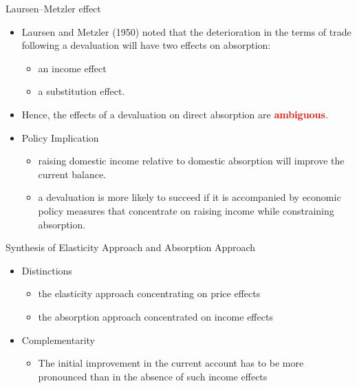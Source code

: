 \documentclass[10pt,hyperref={CJKbookmarks=true},xcolor=dvipsnames,aspectratio=169]{beamer}
\begin{document}
\begin{frame}{Laursen–Metzler effect}

\begin{itemize}
\item Laursen and Metzler (1950) noted that the deterioration in the terms
of trade following a devaluation will have two effects on absorption:

\begin{itemize}
\item an income effect 
\item a substitution effect.
\end{itemize}
\item Hence, the effects of a devaluation on direct absorption are \textbf{\textcolor{red}{ambiguous}}.
\item Policy Implication

\begin{itemize}
\item raising domestic income relative to domestic absorption will improve
the current balance. 
\item a devaluation is more likely to succeed if it is accompanied by economic
policy measures that concentrate on raising income while constraining
absorption.
\end{itemize}
\end{itemize}
\end{frame}

\begin{frame}{Synthesis of Elasticity Approach and Absorption Approach}

\begin{itemize}
\item Distinctions

\begin{itemize}
\item the elasticity approach concentrating on price effects
\item the absorption approach concentrated on income effects
\end{itemize}
\item Complementarity

\begin{itemize}
\item The initial improvement in the current account has to be more pronounced
than in the absence of such income effects
\end{itemize}
\end{itemize}
\end{frame}
\end{document}
